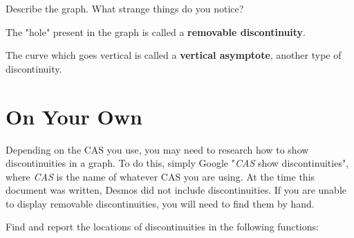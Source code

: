 \documentclass{ximera}
\begin{document}
\begin{question}
Describe the graph. What strange things do you notice?
\begin{freeResponse}
\end{freeResponse}
\end{question}
The "hole" present in the graph is called a \textbf{removable discontinuity}.

The curve which goes vertical is called a \textbf{vertical asymptote}, another type of discontinuity.

\section{On Your Own}
Depending on the CAS you use, you may need to research how to show discontinuities in a graph. To do this, simply Google "\textit{CAS} show discontinuities", where \textit{CAS} is the name of whatever CAS you are using. At the time this document was written, Desmos did not include discontinuities. If you are unable to display removable discontinuities, you will need to find them by hand.

Find and report the locations of discontinuities in the following functions:
\end{document}
